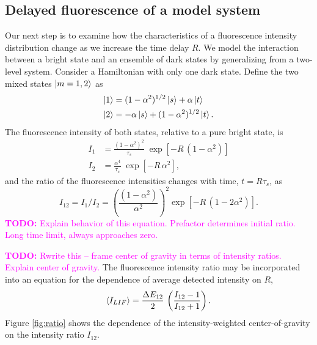 \documentclass[12pt]{mitthesis}
\newcommand{\TODO} [1]{\textcolor{magenta}{\textbf{TODO:} #1}}
\begin{document}
\subsection{Delayed fluorescence of a model system}

Our next step is to examine how the characteristics of a
fluorescence intensity distribution change as we increase the time delay
$R$.  We model the interaction between a bright state and an
ensemble of dark states by generalizing from a two-level system.
Consider a Hamiltonian with only one dark state.  Define the two mixed
states $\mathinner{|{m=1,2}\rangle}$ as
\begin{equation}
  \begin{split}
    \mathinner{|{1}\rangle} &=  (1 - \alpha^2)^{1/2} \mathinner{|{s}\rangle} + \alpha \mathinner{|{t}\rangle}\\
    \mathinner{|{2}\rangle} &= -\alpha \mathinner{|{s}\rangle} + (1 - \alpha^2)^{1/2} \mathinner{|{t}\rangle}.
  \end{split}
\end{equation}
The fluorescence intensity of both states, relative to a pure bright
state, is
\begin{equation}
  \begin{split}
    I_1 &= \frac{(1 - \alpha^2)^2}{\tau_s} \; \exp 
          \left[
            - R \, (1 - \alpha^2)
          \right]\\
    I_2 &= \frac{\alpha^4}{\tau_s} \; \exp 
          \left[
            - R \, \alpha^2
          \right],
  \end{split}
\end{equation}
and the ratio of the fluorescence intensities changes with time,
$t=R\tau_s$, as
\begin{equation}
  I_{12} = I_1 / I_2 = 
  \left(
    \frac{(1 - \alpha^2)}{\alpha^2}
  \right)^2
  \exp
  \left[
    - R \, (1 - 2\alpha^2)
  \right].
\end{equation}  \TODO{Explain behavior of this equation.  Prefactor
  determines initial ratio.  Long time limit, always approaches zero.}

\TODO{Rwrite this -- frame center of gravity in terms of intensity
  ratios.  Explain center of gravity.}  The fluorescence intensity
ratio may be incorporated into an equation for the dependence of
average detected intensity on $R$,
\begin{equation}
  \label{eq:ratio}
  \mathinner{\langle{I_{LIF}}\rangle} = 
  \frac{\Delta E_{12}}{2} \,
  \left(
    \frac{I_{12}-1}{I_{12}+1}
  \right).
\end{equation}
Figure \ref{fig:ratio} shows the dependence of the intensity-weighted
center-of-gravity on the intensity ratio $I_{12}$.
\end{document}
